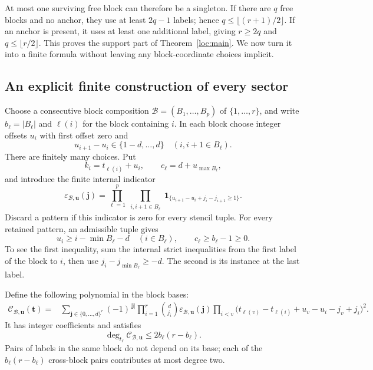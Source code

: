 \documentclass[11pt,a4paper]{article}
\numberwithin{equation}{section}
\theoremstyle{definition}
\theoremstyle{remark}
\newcommand{\ind}{\mathbf 1}
\begin{document}
At most one surviving free block can therefore be a singleton.  If
there are $q$ free blocks and no anchor, they use at least $2q-1$ labels;
hence $q\le\lfloor(r+1)/2\rfloor$.  If an anchor is present, it uses at
least one additional label, giving $r\ge2q$ and
$q\le\lfloor r/2\rfloor$.  This proves the support part of
Theorem~\ref{loc:main}.  We now turn it into a finite formula without
leaving any block-coordinate choices implicit.

\subsection{An explicit finite construction of every sector}

Choose a consecutive block composition
$\mathcal B=(B_1,\ldots,B_p)$ of $\{1,\ldots,r\}$, and write
$b_\ell=|B_\ell|$ and $\ell(i)$ for the block containing $i$.  In each
block choose integer offsets $u_i$ with first offset zero and
\begin{equation}
 u_{i+1}-u_i\in\{1-d,\ldots,d\}
                    \quad(i,i+1\in B_\ell).
 \label{loc:offsets}
\end{equation}
There are finitely many choices.  Put
\[
 k_i=t_{\ell(i)}+u_i,
 \qquad c_\ell=d+u_{\max B_\ell},
\]
and introduce the finite internal indicator
\[
 \varepsilon_{\mathcal B,\mathbf u}(\mathbf j)
 =\prod_{\ell=1}^p\prod_{\substack{i,i+1\in B_\ell}}
       \ind_{\{u_{i+1}-u_i+j_i-j_{i+1}\ge1\}}.
\]
Discard a pattern if this indicator is zero for every stencil tuple.
For every retained pattern, an admissible tuple gives
\begin{equation}
 u_i\ge i-\min B_\ell-d\quad(i\in B_\ell),
 \qquad c_\ell\ge b_\ell-1\ge0.
 \label{loc:offset-feasibility}
\end{equation}
To see the first inequality, sum the internal strict inequalities from
the first label of the block to $i$, then use $j_i-j_{\min B_\ell}\ge-d$.
The second is its instance at the last label.

Define the following polynomial in the block bases:
\begin{align}
 \mathcal C_{\mathcal B,\mathbf u}(\mathbf t)
 ={}&\sum_{\mathbf j\in\{0,\ldots,d\}^r}
       (-1)^{|\mathbf j|}\prod_{i=1}^r\binom d{j_i}
       \varepsilon_{\mathcal B,\mathbf u}(\mathbf j)
       \prod_{i<v}
       \bigl(t_{\ell(v)}-t_{\ell(i)}+u_v-u_i-j_v+j_i\bigr)^2.
 \label{loc:sector-polynomial}
\end{align}
It has integer coefficients and satisfies
\begin{equation}
 \deg_{t_\ell}\mathcal C_{\mathcal B,\mathbf u}
                         \le 2b_\ell(r-b_\ell).
 \label{loc:sector-degree}
\end{equation}
Pairs of labels in the same block do not depend on its base; each of
the $b_\ell(r-b_\ell)$ cross-block pairs contributes at most degree two.
\end{document}
